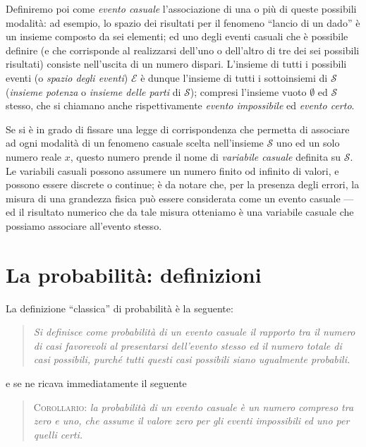 Definiremo poi come \emph{evento casuale} l'associazione di
una o pi\`u di queste possibili modalit\`a: ad esempio, lo
spazio dei risultati per il fenomeno ``lancio di un dado''
\`e un insieme composto da sei elementi; ed uno degli eventi
casuali che \`e possibile definire (e che corrisponde al
realizzarsi dell'uno o dell'altro di tre dei sei possibili
risultati) consiste nell'uscita di un numero dispari.
L'insieme di tutti i possibili eventi (o \emph{spazio degli
  eventi}) $\mathcal{E}$ \`e dunque l'insieme di tutti i
sottoinsiemi di $\mathcal{S}$ (\emph{insieme potenza} o
\emph{insieme delle parti} di $\mathcal{S}$); compresi
l'insieme vuoto $\emptyset$ ed $\mathcal{S}$ stesso, che si
chiamano anche rispettivamente \emph{evento impossibile} ed
\emph{evento certo}.%

%
Se si \`e in grado di fissare una legge di corrispondenza
che permetta di associare ad ogni modalit\`a di un fenomeno
casuale scelta nell'insieme $\mathcal{S}$ uno ed un solo
numero reale $x$, questo numero prende il nome di
\emph{variabile casuale} definita su $\mathcal{S}$.  Le
variabili casuali possono assumere un numero finito od
infinito di valori, e possono essere discrete o continue;
\`e da notare che, per la presenza degli errori, la misura
di una grandezza fisica pu\`o essere considerata come un
evento casuale --- ed il risultato numerico che da tale
misura otteniamo \`e una variabile casuale che possiamo
associare all'evento stesso.%

\section{La probabilit\`a: definizioni}
La definizione ``classica'' di probabilit\`a \`e la
seguente:
\begin{quote}
  \textit{Si definisce come probabilit\`a di un evento
    casuale il rapporto tra il numero di casi favorevoli al
    presentarsi dell'evento stesso ed il numero totale di
    casi possibili, purch\'e tutti questi casi possibili
    siano ugualmente probabili.}
\end{quote}
e se ne ricava immediatamente il seguente
\begin{quote}
  \textsc{Corollario:} \textit{la probabilit\`a di un evento
    casuale \`e un numero compreso tra zero e uno, che
    assume il valore zero per gli eventi impossibili ed uno
    per quelli certi.}
\end{quote}

